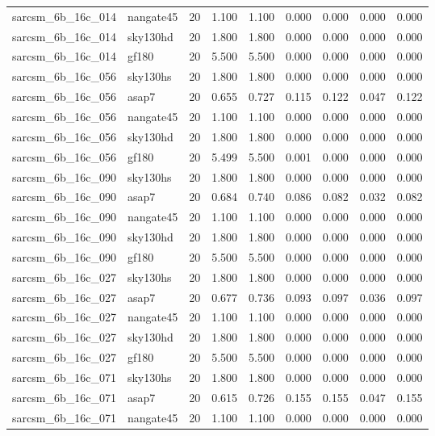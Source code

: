 \begin{tabular}{llrrrrrrr}
sarcsm\_6b\_16c\_014 & nangate45 & 20 & 1.100 & 1.100 & 0.000 & 0.000 & 0.000 & 0.000 \\
sarcsm\_6b\_16c\_014 & sky130hd & 20 & 1.800 & 1.800 & 0.000 & 0.000 & 0.000 & 0.000 \\
sarcsm\_6b\_16c\_014 & gf180 & 20 & 5.500 & 5.500 & 0.000 & 0.000 & 0.000 & 0.000 \\
sarcsm\_6b\_16c\_056 & sky130hs & 20 & 1.800 & 1.800 & 0.000 & 0.000 & 0.000 & 0.000 \\
sarcsm\_6b\_16c\_056 & asap7 & 20 & 0.655 & 0.727 & 0.115 & 0.122 & 0.047 & 0.122 \\
sarcsm\_6b\_16c\_056 & nangate45 & 20 & 1.100 & 1.100 & 0.000 & 0.000 & 0.000 & 0.000 \\
sarcsm\_6b\_16c\_056 & sky130hd & 20 & 1.800 & 1.800 & 0.000 & 0.000 & 0.000 & 0.000 \\
sarcsm\_6b\_16c\_056 & gf180 & 20 & 5.499 & 5.500 & 0.001 & 0.000 & 0.000 & 0.000 \\
sarcsm\_6b\_16c\_090 & sky130hs & 20 & 1.800 & 1.800 & 0.000 & 0.000 & 0.000 & 0.000 \\
sarcsm\_6b\_16c\_090 & asap7 & 20 & 0.684 & 0.740 & 0.086 & 0.082 & 0.032 & 0.082 \\
sarcsm\_6b\_16c\_090 & nangate45 & 20 & 1.100 & 1.100 & 0.000 & 0.000 & 0.000 & 0.000 \\
sarcsm\_6b\_16c\_090 & sky130hd & 20 & 1.800 & 1.800 & 0.000 & 0.000 & 0.000 & 0.000 \\
sarcsm\_6b\_16c\_090 & gf180 & 20 & 5.500 & 5.500 & 0.000 & 0.000 & 0.000 & 0.000 \\
sarcsm\_6b\_16c\_027 & sky130hs & 20 & 1.800 & 1.800 & 0.000 & 0.000 & 0.000 & 0.000 \\
sarcsm\_6b\_16c\_027 & asap7 & 20 & 0.677 & 0.736 & 0.093 & 0.097 & 0.036 & 0.097 \\
sarcsm\_6b\_16c\_027 & nangate45 & 20 & 1.100 & 1.100 & 0.000 & 0.000 & 0.000 & 0.000 \\
sarcsm\_6b\_16c\_027 & sky130hd & 20 & 1.800 & 1.800 & 0.000 & 0.000 & 0.000 & 0.000 \\
sarcsm\_6b\_16c\_027 & gf180 & 20 & 5.500 & 5.500 & 0.000 & 0.000 & 0.000 & 0.000 \\
sarcsm\_6b\_16c\_071 & sky130hs & 20 & 1.800 & 1.800 & 0.000 & 0.000 & 0.000 & 0.000 \\
sarcsm\_6b\_16c\_071 & asap7 & 20 & 0.615 & 0.726 & 0.155 & 0.155 & 0.047 & 0.155 \\
sarcsm\_6b\_16c\_071 & nangate45 & 20 & 1.100 & 1.100 & 0.000 & 0.000 & 0.000 & 0.000 \\

\end{tabular}
